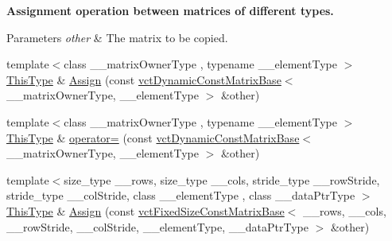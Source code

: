 \begin{Indent}{\bf Assignment operation between matrices of different types.}\par
{\em 
\begin{DoxyParams}{Parameters}
{\em other} & The matrix to be copied. \\
\hline
\end{DoxyParams}
}\begin{DoxyCompactItemize}
\item 
{\footnotesize template$<$class \-\_\-\-\_\-matrix\-Owner\-Type , typename \-\_\-\-\_\-element\-Type $>$ }\\\hyperlink{classvct_dynamic_const_matrix_base_ac4ff48cbe4d9de3fdef5a02447ffb9db}{This\-Type} \& \hyperlink{classvct_dynamic_matrix_base_af0e9859c9894141fb449a15cb0af35e8}{Assign} (const \hyperlink{classvct_dynamic_const_matrix_base}{vct\-Dynamic\-Const\-Matrix\-Base}$<$ \-\_\-\-\_\-matrix\-Owner\-Type, \-\_\-\-\_\-element\-Type $>$ \&other)
\item 
{\footnotesize template$<$class \-\_\-\-\_\-matrix\-Owner\-Type , typename \-\_\-\-\_\-element\-Type $>$ }\\\hyperlink{classvct_dynamic_const_matrix_base_ac4ff48cbe4d9de3fdef5a02447ffb9db}{This\-Type} \& \hyperlink{classvct_dynamic_matrix_base_ac9f3f19656b73d73cd97a8d4fac546be}{operator=} (const \hyperlink{classvct_dynamic_const_matrix_base}{vct\-Dynamic\-Const\-Matrix\-Base}$<$ \-\_\-\-\_\-matrix\-Owner\-Type, \-\_\-\-\_\-element\-Type $>$ \&other)
\item 
{\footnotesize template$<$size\-\_\-type \-\_\-\-\_\-rows, size\-\_\-type \-\_\-\-\_\-cols, stride\-\_\-type \-\_\-\-\_\-row\-Stride, stride\-\_\-type \-\_\-\-\_\-col\-Stride, class \-\_\-\-\_\-element\-Type , class \-\_\-\-\_\-data\-Ptr\-Type $>$ }\\\hyperlink{classvct_dynamic_const_matrix_base_ac4ff48cbe4d9de3fdef5a02447ffb9db}{This\-Type} \& \hyperlink{classvct_dynamic_matrix_base_a466a3850e96b4ab27a981edf1035d182}{Assign} (const \hyperlink{classvct_fixed_size_const_matrix_base}{vct\-Fixed\-Size\-Const\-Matrix\-Base}$<$ \-\_\-\-\_\-rows, \-\_\-\-\_\-cols, \-\_\-\-\_\-row\-Stride, \-\_\-\-\_\-col\-Stride, \-\_\-\-\_\-element\-Type, \-\_\-\-\_\-data\-Ptr\-Type $>$ \&other)
\end{DoxyCompactItemize}
\end{Indent}
